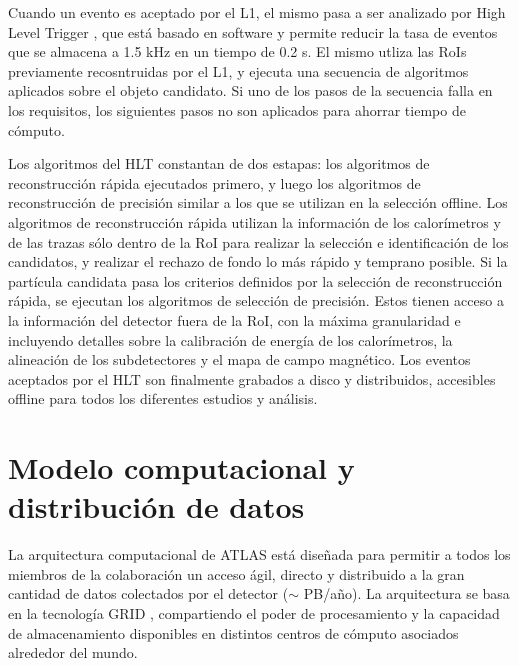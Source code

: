 Cuando un evento es aceptado por el L1, el mismo pasa a ser analizado por High Level Trigger \cite{ATLAS-TDR-16}, que está basado en software y permite reducir la tasa de eventos que se almacena a 1.5 kHz en un tiempo de 0.2 s. El mismo utliza las RoIs previamente recosntruidas por el L1, y ejecuta una secuencia de algoritmos aplicados sobre el objeto candidato. Si uno de los pasos de la secuencia falla en los requisitos, los siguientes pasos no son aplicados para ahorrar tiempo de cómputo. 


Los algoritmos del HLT constantan de dos estapas: los algoritmos de reconstrucción rápida ejecutados primero, y luego los algoritmos de reconstrucción de precisión similar a los que se utilizan en la selección offline. Los algoritmos de reconstrucción rápida utilizan la información de los calorímetros y de las trazas sólo dentro de la RoI para realizar la selección e identificación de los candidatos, y realizar el rechazo de fondo lo más rápido y temprano posible. Si la partícula candidata pasa los criterios definidos por la selección de reconstrucción rápida, se ejecutan los algoritmos de selección de precisión. Estos tienen acceso a la información del detector fuera de la RoI, con la máxima granularidad e incluyendo detalles sobre la calibración de energía de los calorímetros, la alineación de los subdetectores y el mapa de campo magnético. Los eventos aceptados por el HLT son finalmente grabados a disco y distribuidos, accesibles offline para todos los diferentes estudios y análisis.

\section{Modelo computacional y distribución de datos}


La arquitectura computacional de ATLAS está diseñada para permitir a todos los miembros de la colaboración un acceso ágil, directo y distribuido a la gran cantidad de datos colectados por el detector ($\sim$ PB/año). La arquitectura se basa en la tecnología GRID \cite{grid}, compartiendo el poder de procesamiento y la capacidad de almacenamiento disponibles en distintos centros de cómputo asociados alrededor del
mundo.

